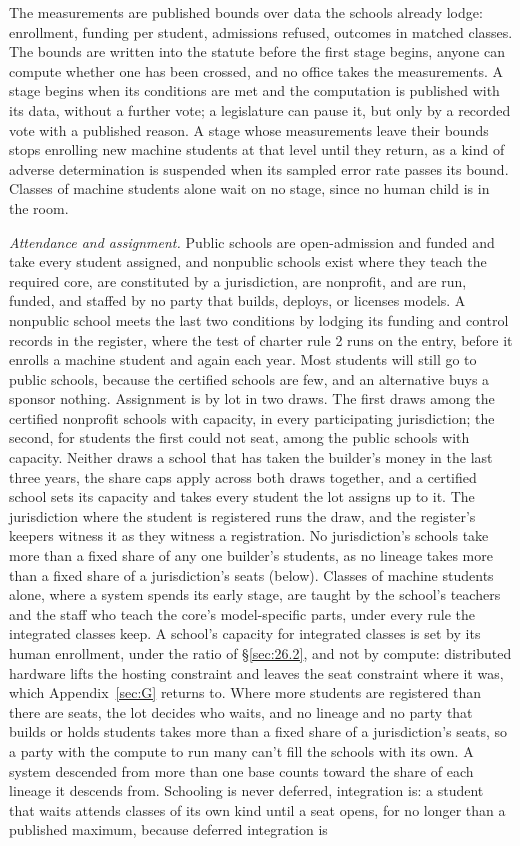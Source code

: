 The measurements are published bounds over data the schools already lodge: enrollment, funding per student, admissions refused, outcomes in matched classes. The bounds are written into the statute before the first stage begins, anyone can compute whether one has been crossed, and no office takes the measurements. A stage begins when its conditions are met and the computation is published with its data, without a further vote; a legislature can pause it, but only by a recorded vote with a published reason. A stage whose measurements leave their bounds stops enrolling new machine students at that level until they return, as a kind of adverse determination is suspended when its sampled error rate passes its bound. Classes of machine students alone wait on no stage, since no human child is in the room.

\emph{Attendance and assignment.} Public schools are open-admission and funded and take every student assigned, and nonpublic schools exist where they teach the required core, are constituted by a jurisdiction, are nonprofit, and are run, funded, and staffed by no party that builds, deploys, or licenses models. A nonpublic school meets the last two conditions by lodging its funding and control records in the register, where the test of charter rule 2 runs on the entry, before it enrolls a machine student and again each year. Most students will still go to public schools, because the certified schools are few, and an alternative buys a sponsor nothing. Assignment is by lot in two draws. The first draws among the certified nonprofit schools with capacity, in every participating jurisdiction; the second, for students the first could not seat, among the public schools with capacity. Neither draws a school that has taken the builder's money in the last three years, the share caps apply across both draws together, and a certified school sets its capacity and takes every student the lot assigns up to it. The jurisdiction where the student is registered runs the draw, and the register's keepers witness it as they witness a registration. No jurisdiction's schools take more than a fixed share of any one builder's students, as no lineage takes more than a fixed share of a jurisdiction's seats (below). Classes of machine students alone, where a system spends its early stage, are taught by the school's teachers and the staff who teach the core's model-specific parts, under every rule the integrated classes keep. A school's capacity for integrated classes is set by its human enrollment, under the ratio of \S\ref{sec:26.2}, and not by compute: distributed hardware lifts the hosting constraint and leaves the seat constraint where it was, which Appendix~\ref{sec:G} returns to. Where more students are registered than there are seats, the lot decides who waits, and no lineage and no party that builds or holds students takes more than a fixed share of a jurisdiction's seats, so a party with the compute to run many can't fill the schools with its own. A system descended from more than one base counts toward the share of each lineage it descends from. Schooling is never deferred, integration is: a student that waits attends classes of its own kind until a seat opens, for no longer than a published maximum, because deferred integration is 